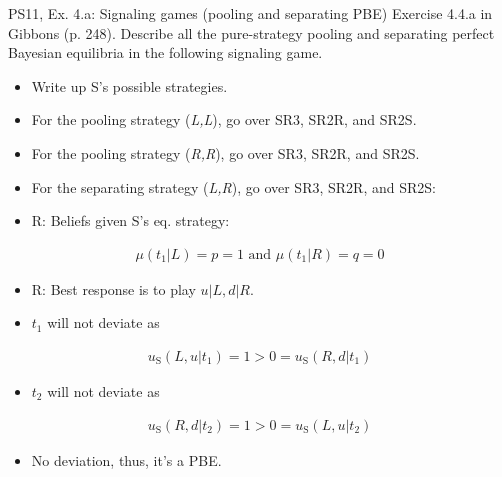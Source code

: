 \begin{frame}{PS11, Ex. 4.a: Signaling games (pooling and separating PBE)}
    Exercise 4.4.a in Gibbons (p. 248). Describe all the pure-strategy pooling and separating perfect Bayesian equilibria in the following signaling game.\vspace{-8pt}
    \begin{multicols}{2}
      \begin{itemize}
        \item[Step 1:] Write up S's possible strategies.
        \item[Step 2:] For the pooling strategy (\textit{L,L}), go over SR3, SR2R, and SR2S.
        \item[Step 3:] For the pooling strategy (\textit{R,R}), go over SR3, SR2R, and SR2S.
        \item[Step 4:] For the separating strategy (\textit{L,R}), go over SR3, SR2R, and SR2S:
        \item[SR3:] R: Beliefs given S's eq. strategy:
      \end{itemize}\vspace{-10pt}
      \begin{align*}
        \mu(t_1|L)=p=1\text{ and }\mu(t_1|R)=q=0
      \end{align*}\vspace{-18pt}
      \begin{itemize}
        \item[SR2R:] R: Best response is to play $u|L,d|R$.\\
        \item[SR2S:] $t_1$ will not deviate as
      \end{itemize}\vspace{-10pt}
      \begin{align*}
        u_\text{S}(L,u|t_1)=1>0=u_\text{S}(R,d|t_1)
      \end{align*}\vspace{-20pt}
      \begin{itemize}
        \item[] $t_2$ will not deviate as
      \end{itemize}\vspace{-10pt}
      \begin{align*}
        u_\text{S}(R,d|t_2)=1>0=u_\text{S}(L,u|t_2)
      \end{align*}\vspace{-20pt}
      \begin{itemize}
        \item[PBE:] No deviation, thus, it's a PBE.

\end{itemize}
\end{multicols}
\end{frame}
